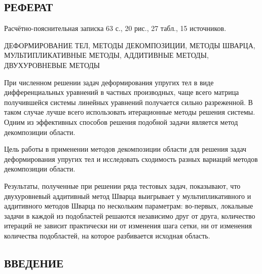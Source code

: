 \documentclass[a4paper, 14pt]{extarticle}
\begin{document}
\newpage

\begin{center}
\section*{\centering РЕФЕРАТ}
\end{center}
\setcounter{page}{2}

Расчётно-пояснительная записка 63 с., 20 рис., 27 табл., 15 источников.

ДЕФОРМИРОВАНИЕ ТЕЛ, МЕТОДЫ ДЕКОМПОЗИЦИИ, МЕТОДЫ ШВАРЦА, МУЛЬТИПЛИКАТИВНЫЕ МЕТОДЫ, АДДИТИВНЫЕ МЕТОДЫ, ДВУХУРОВНЕВЫЕ МЕТОДЫ

При численном решении задач деформирования упругих тел в виде дифференциальных уравнений в частных производных, чаще всего матрица получившейся системы линейных уравнений получается сильно разреженной. В таком случае лучше всего использовать итерационные методы решения системы. Одним из эффективных способов решения подобной задачи является метод декомпозиции области.

Цель работы в применении методов декомпозиции области для решения задач деформирования упругих тел и исследовать сходимость разных вариаций методов декомпозиции области.

Результаты, полученные при решении ряда тестовых задач, показывают, что двухуровневый аддитивный метод Шварца выигрывает у мультипликативного и аддитивного методов Шварца по нескольким параметрам: во-первых, локальные задачи в каждой из подобластей решаются независимо друг от друга, количество итераций не зависит практически ни от изменения шага сетки, ни от изменения количества подобластей, на которое разбивается исходная область.

\newpage


\renewcommand*\contentsname{\begin{center}СОДЕРЖАНИЕ\end{center}}
	
\tableofcontents


\newpage

\begin{center}
\section*{\centering ВВЕДЕНИЕ}
\end{center}
\end{document}
